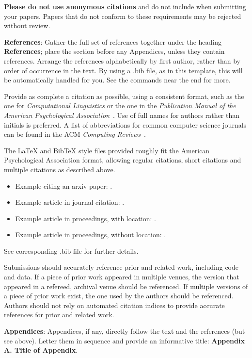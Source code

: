 \documentclass[11pt,a4paper]{article}
\begin{document}
\textbf{Please do not use anonymous citations} and do not include
 when submitting your papers. Papers that do not
conform to these requirements may be rejected without review.

\textbf{References}: Gather the full set of references together under
the heading {\bf References}; place the section before any Appendices,
unless they contain references. Arrange the references alphabetically
by first author, rather than by order of occurrence in the text.
By using a .bib file, as in this template, this will be automatically 
handled for you. See the \verb|| commands near the end for more.

Provide as complete a citation as possible, using a consistent format,
such as the one for {\em Computational Linguistics\/} or the one in the 
{\em Publication Manual of the American 
Psychological Association\/}~\cite{APA:83}. Use of full names for
authors rather than initials is preferred. A list of abbreviations
for common computer science journals can be found in the ACM 
{\em Computing Reviews\/}~\cite{ACM:83}.

The \LaTeX{} and Bib\TeX{} style files provided roughly fit the
American Psychological Association format, allowing regular citations, 
short citations and multiple citations as described above.  

\begin{itemize}
\item Example citing an arxiv paper: \cite{rasooli-tetrault-2015}. 
\item Example article in journal citation: \cite{Ando2005}.
\item Example article in proceedings, with location: \cite{borsch2011}.
\item Example article in proceedings, without location: \cite{andrew2007scalable}.
\end{itemize}
See corresponding .bib file for further details.

Submissions should accurately reference prior and related work, including code and data. If a piece of prior work appeared in multiple venues, the version that appeared in a refereed, archival venue should be referenced. If multiple versions of a piece of prior work exist, the one used by the authors should be referenced. Authors should not rely on automated citation indices to provide accurate references for prior and related work.

{\bf Appendices}: Appendices, if any, directly follow the text and the
references (but see above).  Letter them in sequence and provide an
informative title: {\bf Appendix A. Title of Appendix}.
\end{document}
